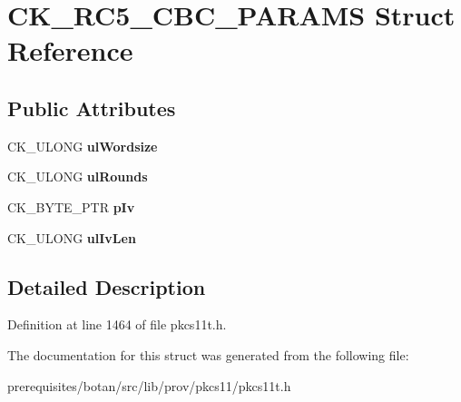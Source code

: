 \hypertarget{struct_c_k___r_c5___c_b_c___p_a_r_a_m_s}{}\section{C\+K\+\_\+\+R\+C5\+\_\+\+C\+B\+C\+\_\+\+P\+A\+R\+A\+MS Struct Reference}
\label{struct_c_k___r_c5___c_b_c___p_a_r_a_m_s}
\subsection*{Public Attributes}
\begin{DoxyCompactItemize}
\item 
\mbox{\label{struct_c_k___r_c5___c_b_c___p_a_r_a_m_s_a8c73bb58423c42d45a96a32c206c408a}} 
C\+K\+\_\+\+U\+L\+O\+NG {\bfseries ul\+Wordsize}
\item 
\mbox{\label{struct_c_k___r_c5___c_b_c___p_a_r_a_m_s_aba2db9c3d541acf5bdd8b1ba6ff8699e}} 
C\+K\+\_\+\+U\+L\+O\+NG {\bfseries ul\+Rounds}
\item 
\mbox{\label{struct_c_k___r_c5___c_b_c___p_a_r_a_m_s_a1441cbb43877674445af7a863bf5ee39}} 
C\+K\+\_\+\+B\+Y\+T\+E\+\_\+\+P\+TR {\bfseries p\+Iv}
\item 
\mbox{\label{struct_c_k___r_c5___c_b_c___p_a_r_a_m_s_ac1636fd00784fd3994a40a4f1668a8f8}} 
C\+K\+\_\+\+U\+L\+O\+NG {\bfseries ul\+Iv\+Len}
\end{DoxyCompactItemize}


\subsection{Detailed Description}


Definition at line 1464 of file pkcs11t.\+h.



The documentation for this struct was generated from the following file\+:\begin{DoxyCompactItemize}
\item 
prerequisites/botan/src/lib/prov/pkcs11/pkcs11t.\+h\end{DoxyCompactItemize}
